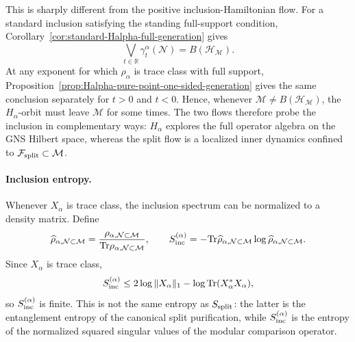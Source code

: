 \documentclass[a4paper,11pt]{article}
\theoremstyle{definition}
\newcommand{\Tr}{\text{Tr}}
\newcommand{\mN}{\mathcal{N}}
\newcommand{\mH}{\mathcal{H}}
\newcommand{\mM}{\mathcal{M}}
\begin{document}
This is sharply different from the positive inclusion-Hamiltonian flow. For
a standard inclusion satisfying the standing full-support condition, Corollary~\ref{cor:standard-Halpha-full-generation}
gives
\begin{equation}
    \bigvee_{t\in\mathbb R}
    \gamma_t^\alpha(\mN)
    =B(\mH_{\mM}).
    \label{eq:Hinc-does-not-preserve-N}
\end{equation}
At any exponent for which $\rho_\alpha$ is trace class with full support,
Proposition~\ref{prop:Halpha-pure-point-one-sided-generation} gives the same
conclusion separately for $t>0$ and $t<0$.
Hence, whenever $\mM\neq B(\mH_{\mM})$, the $H_\alpha$-orbit must
leave $\mM$ for some times. The two flows therefore probe the inclusion
in complementary ways: $H_\alpha$ explores the full operator algebra on the
GNS Hilbert space, whereas the split flow is a localized inner dynamics
confined to $\mathcal F_{\rm split}\subset\mM$.

\paragraph{Inclusion entropy.}
Whenever $X_\alpha$ is trace class, the inclusion spectrum can be normalized to a density matrix. Define
\begin{equation}
    \widehat\rho_{\alpha,\mN\subset\mM}
    =\frac{\rho_{\alpha,\mN\subset\mM}}
           {\Tr\rho_{\alpha,\mN\subset\mM}},
    \qquad
    S_{\rm inc}^{(\alpha)}
    =-\Tr\widehat\rho_{\alpha,\mN\subset\mM}
          \log\widehat\rho_{\alpha,\mN\subset\mM}.
    \label{eq:rho-inclusion-normalized}
\end{equation}
Since $X_\alpha$ is trace class,
\begin{equation}
    S_{\rm inc}^{(\alpha)}
    \le
    2\log\|X_\alpha\|_1
    -\log\Tr(X_\alpha^*X_\alpha),
    \label{eq:Sinclusion-nuclearity-bound}
\end{equation}
so $S_{\rm inc}^{(\alpha)}$ is finite. This is not the same entropy as
$S_{\rm split}$: the latter is the entanglement entropy of the canonical split
purification, while $S_{\rm inc}^{(\alpha)}$ is the entropy of the normalized
squared singular values of the modular comparison operator.
\end{document}
